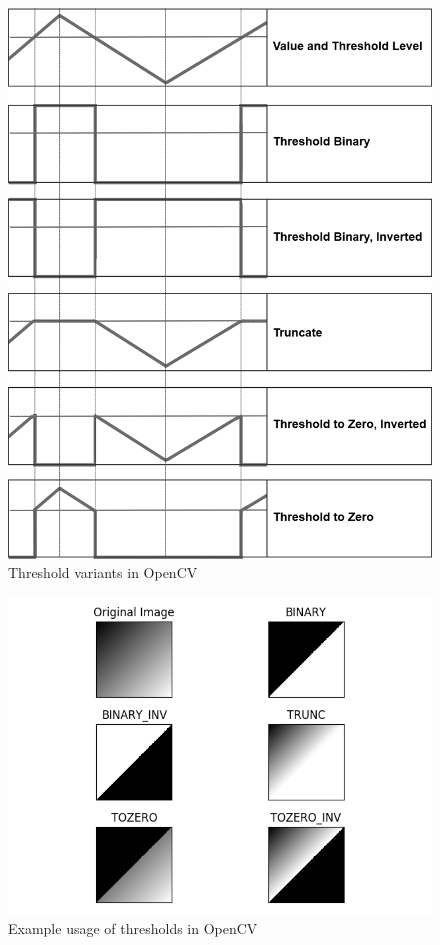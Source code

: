 \begin{figure}[H]
	\centering
	\includegraphics[width=\textwidth]{images/thresholds}
	\caption{Threshold variants in OpenCV}
	\label{fig:threshold_variants}
\end{figure}

\begin{figure}
	\centering
	\includegraphics[width=\textwidth]{images/thresholds_example}
	\caption{Example usage of thresholds in OpenCV}
	\label{fig:threshold_examples}
\end{figure}

